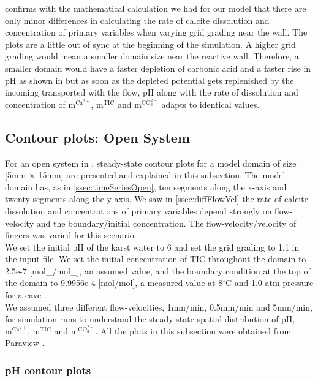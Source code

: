  confirms with the mathematical calculation we had for our model that there are only minor differences 
in calculating the rate of calcite dissolution and concentration of primary variables when varying grid grading near the wall. 
The plots are a little out of sync at the beginning of the simulation. A higher grid grading would mean a smaller domain size near 
the reactive wall. Therefore, a smaller domain would have a faster depletion of carbonic acid and a faster rise in pH as shown in  but 
as soon as the depleted potential gets replenished by the incoming  transported with the flow, pH along with the rate of dissolution and concentration of 
$\mathrm{m^{Ca^{2+}}}$, $\mathrm{m^{TIC}}$ and $\mathrm{m^{CO_3^{2-}}}$ adapts to identical values. 

\subsection{Contour plots: Open System} \label{ssec:contour}
For an open system in \DuMuX, steady-state contour plots for a model domain of size [5mm $\times$ 15mm] are presented and explained in this subsection.
The model domain has, as in \ref{ssec:timeSeriesOpen}, ten segments along the x-axis and twenty segments along the y-axis. We saw in \ref{ssec:diffFlowVel}
the rate of calcite dissolution and concentrations of primary variables depend strongly on flow-velocity and the boundary/initial  concentration. 
The flow-velocity/velocity of  fingers was varied for this scenario. \\
We set the initial pH of the karst water to 6 and set the grid grading to 1.1 in the input file. 
We set the initial concentration of TIC throughout the domain to 2.5e-7 [mol\_/mol\_], an assumed value, and the 
boundary condition at the top of the domain to 9.9956e-4 [mol/mol], a measured value at 8$^{\circ}$C and 1.0 atm pressure for a cave \cite{Class2020}. \\
We assumed three different flow-velocities, 1mm/min, 0.5mm/min and 5mm/min, for simulation runs to understand the steady-state spatial distribution of 
pH, $\mathrm{m^{Ca^{2+}}}$, $\mathrm{m^{TIC}}$ and $\mathrm{m^{CO_3^{2-}}}$. 
All the plots in this subsection were obtained from Paraview \cite{ahrens2005paraview}.

\subsubsection*{pH contour plots} \label{sssec:contourpH}

